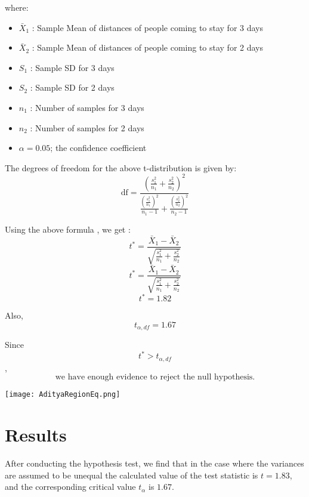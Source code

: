 \documentclass[oneside]{book}
\begin{document}

where:
\begin{itemize}
    \item $\bar{X}_1$ : Sample Mean of distances of people coming to stay for 3 days
    \item $\bar{X}_2$ : Sample Mean of distances of people coming to stay for 2 days
    \item $S_1$ : Sample SD for 3 days
    \item $S_2$ : Sample SD for 2 days
    \item $n_1$ : Number of samples for 3 days 
    \item $n_2$ : Number of samples for 2 days
    \item $\alpha = 0.05$; the confidence coefficient
\end{itemize}

The degrees of freedom for the above t-distribution is given by:
\Large \[ \text{df} = \frac{\left(\frac{s_1^2}{n_1} + \frac{s_2^2}{n_2}\right)^2}{\frac{\left(\frac{s_1^2}{n_1}\right)^2}{n_1 - 1} + \frac{\left(\frac{s_2^2}{n_2}\right)^2}{n_2 - 1}} \]

\large Using the above formula , we get :
\[ t^* = \frac{\bar{X}_1 - \bar{X}_2}{\sqrt{\frac{s_1^2}{n_1} + \frac{s_2^2}{n_2}}} \]
\[ t^* = \frac{\bar{X}_1 - \bar{X}_2}{\sqrt{\frac{s_1^2}{n_1} + \frac{s_2^2}{n_2}}} \]
\[ t^* = 1.82\]

Also,
\[t_{\alpha, df} = 1.67\] 

Since 
\[ t^* > t_{\alpha, df}\],
\[\text{we have enough evidence to reject the null hypothesis.}\]

\begin{minipage}{\textwidth}
    \centering
    \texttt{[image: AdityaRegionEq.png]}
    \label{fig:enter-label}
\end{minipage}

\section{Results}
After conducting the hypothesis test, we find that in the case where the variances are assumed to be unequal the calculated value of the test statistic is $t = 1.83$, and the corresponding critical value $t_{\alpha}$ is $1.67$. 
\end{document}
